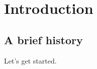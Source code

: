 \chapter{Introduction}
\label{chapter:Introduction}
\thispagestyle{myheadings}

\section{A brief history}
\label{sec:history}

Let's get started.
